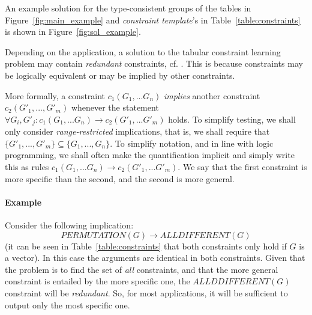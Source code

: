 \documentclass{sig-alternate-05-2015}
\newcommand{\constraints}{\ensuremath{\mathcal{T}}\xspace}
\newcommand{\format}[1]{\textit{#1}\xspace}
\newcommand{\template}{\format{constraint template}}
\newcommand{\groups}{\ensuremath{\mathcal{G}}\xspace}
\begin{document}

An example solution for the type-consistent groups of the tables in Figure~\ref{fig:main_example} and {\template}'s in Table~\ref{table:constraints} is shown in Figure~\ref{fig:sol_example}.


Depending on the application, a solution to the tabular constraint learning problem may contain \textit{redundant} constraints, cf. \cite{bookLuc}. This is because constraints may be logically equivalent or may be implied by other constraints.

More formally, a constraint $c_1(G_1, ... G_n)$ \textit{implies} another constraint~$c_2(G'_1, ..., G'_m)$ whenever
the statement $\forall G_i, G'_j : c_1(G_1, ... G_n) \rightarrow c_2(G'_1, ... G'_m)$ holds. To simplify testing,
we shall only consider {\em range-restricted} implications, that is, we shall require that $\{G'_1, ..., G'_m\} \subseteq \{G_1, ..., G_n\}$.
To simplify notation, and in line with logic programming, we shall often make the quantification implicit and simply write this as rules $ c_1(G_1, ... G_n) \rightarrow c_2(G'_1, ... G'_m)$.  We say that the first constraint is more specific than the second, and the second is more general.



\paragraph{Example}
Consider the following implication:
$$PERMUTATION(G) \rightarrow ALLDIFFERENT(G)$$
(it can be seen in Table~\ref{table:constraints} that both constraints only hold if $G$ is a vector).
In this case the arguments are identical in both constraints.
Given that the problem is to find the set of {\em all} constraints, and that the more general constraint is entailed
by the more specific one, the $ALLDDIFFERENT(G)$ constraint will be {\em redundant}.
So, for most applications, it will be sufficient to output only the most specific one.
\end{document}
